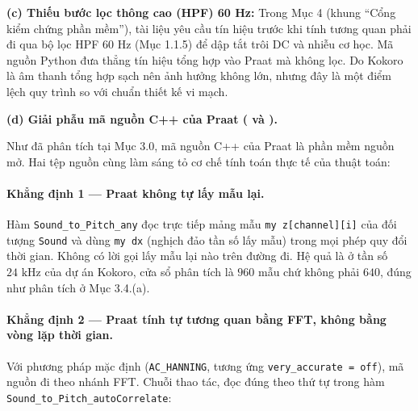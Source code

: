 \documentclass[11pt,a4paper]{article}
\begin{document}
\textbf{(c) Thiếu bước lọc thông cao (HPF) 60 Hz:}
Trong Mục 4 (khung ``Cổng kiểm chứng phần mềm''), tài liệu yêu cầu tín hiệu trước khi tính tương quan phải đi qua bộ lọc HPF 60 Hz (Mục 1.1.5) để dập tắt trôi DC và nhiễu cơ học. Mã nguồn Python đưa thẳng tín hiệu tổng hợp vào Praat mà không lọc. Do Kokoro là âm thanh tổng hợp sạch nên ảnh hưởng không lớn, nhưng đây là một điểm lệch quy trình so với chuẩn thiết kế vi mạch.

\textbf{(d) Giải phẫu mã nguồn C++ của Praat ( và ).}

Như đã phân tích tại Mục 3.0, mã nguồn C++ của Praat là phần mềm nguồn mở. Hai tệp nguồn  cùng  làm sáng tỏ cơ chế tính toán thực tế của thuật toán:

\paragraph{Khẳng định 1 --- Praat không tự lấy mẫu lại.}
Hàm \texttt{Sound\_to\_Pitch\_any} đọc trực tiếp mảng mẫu \texttt{my z[channel][i]} của đối tượng \texttt{Sound} và dùng \texttt{my dx} (nghịch đảo tần số lấy mẫu) trong mọi phép quy đổi thời gian. Không có lời gọi lấy mẫu lại nào trên đường đi. Hệ quả là ở tần số $24\text{ kHz}$ của dự án Kokoro, cửa sổ phân tích là $960$ mẫu chứ không phải $640$, đúng như phân tích ở Mục 3.4.(a).

\paragraph{Khẳng định 2 --- Praat tính tự tương quan bằng FFT, không bằng vòng lặp thời gian.}
Với phương pháp mặc định (\texttt{AC\_HANNING}, tương ứng \texttt{very\_accurate = off}), mã nguồn đi theo nhánh FFT. Chuỗi thao tác, đọc đúng theo thứ tự trong hàm \texttt{Sound\_to\_Pitch\_autoCorrelate}:
\end{document}
